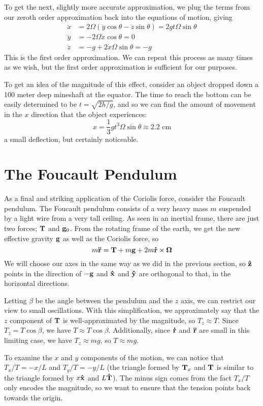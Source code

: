 To get the next, slightly more accurate approximation, we plug the terms from our zeroth order approximation back into the equations of motion, giving
\begin{align*}
    \ddot x &= 2\Omega(\dot y\cos\theta -\dot z\sin\theta) = 2gt\Omega \sin\theta \\
    \ddot y &= -2\Omega\dot x\cos\theta = 0 \\
    \ddot z &= -g + 2\dot x\Omega\sin\theta = -g
\end{align*}
This is the first order approximation. We can repeat this process as many times as we wish, but the first order approximation is sufficient for our purposes.

To get an idea of the magnitude of this effect, consider an object dropped down a 100 meter deep mineshaft at the equator. The time to reach the bottom can be easily determined to be $t= \sqrt{2h/g}$, and so we can find the amount of movement in the $x$ direction that the object experiences:
\[ x = \frac{1}{3}gt^3\Omega\sin\theta \approx 2.2\text{ cm}\]
a small deflection, but certainly noticeable. 
\section{The Foucault Pendulum}
As a final and striking application of the Coriolis force, consider the Foucault pendulum. The Foucault pendulum consists of a very heavy mass $m$ suspended by a light wire from a very tall ceiling. As seen in an inertial frame, there are just two forces; $\mathbf{T}$ and $\mathbf{g}_0$. From the rotating frame of the earth, we get the new effective gravity $\mathbf{g}$ as well as the Coriolis force, so
\[ m\mathbf{\ddot r} = \mathbf{T} + m\mathbf{g} + 2m\mathbf{\dot r}\times\boldsymbol{\Omega}\]
We will choose our axes in the same way as we did in the previous section, so $\mathbf{\hat{z}}$ points in the direction of $-\mathbf{g}$ and $\mathbf{\hat{x}}$ and $\mathbf{\hat{y}}$ are orthogonal to that, in the horizontal directions.

Letting $\beta$ be the angle between the pendulum and the $z$ axis, we can restrict our view to small oscillations. With this simplification, we approximately say that the $z$ component of $\mathbf{T}$ is well-approximated by the magnitude, so $T_z\approx T$. Since $T_z = T\cos\beta$, we have $T \approx T\cos\beta$. Additionally, since $\mathbf{\dot r}$ and $\mathbf{\ddot r}$ are small in this limiting case, we have $T_z\approx mg$, so $T\approx mg$.

To examine the $x$ and $y$ components of the motion, we can notice that $T_x/T = -x/L$ and $T_y/T = -y/L$ (the triangle formed by $\mathbf{T}_x$ and $\mathbf{T}$ is similar to the triangle formed by $x\mathbf{\hat{x}}$ and $L\mathbf{\hat T}$). The minus sign comes from the fact $T_x/T$ only encodes the magnitude, so we want to ensure that the tension points back towards the origin.

